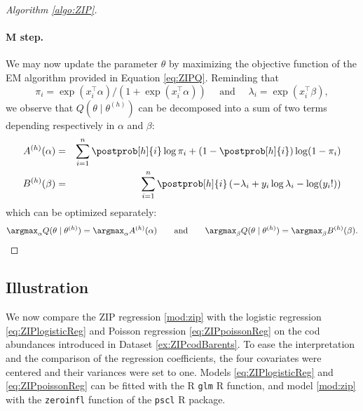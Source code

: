 \begin{proof}[Algorithm \ref{algo:ZIP}]
\paragraph{M step.}
We may now update the parameter $\theta$ by maximizing the objective function of the EM algorithm provided in Equation \eqref{eq:ZIPQ}. %
Reminding that $$\pi_i = \exp(x_i^\top \alpha) /(1 + \exp(x_i^\top \alpha)) \quad \mbox{ and } \quad  \lambda_i = \exp(x_i^\top \beta),$$ we observe that $Q(\theta \mid \theta^{(h)})$ can be decomposed into a sum of two terms depending respectively in $\alpha$ and $\beta$: 
\begin{eqnarray*}	
A^{(h)}(\alpha) &=& \sum_{i=1}^n \postprob[h]{i} \log \pi_i + (1 - \postprob[h]{i}) \log(1- \pi_i) \\
B^{(h)}(\beta)&=& \sum_{i=1}^n \postprob[h]{i} \left(-\lambda_i + y_i \log \lambda_i - \log(y_i!)\right) 
\end{eqnarray*}
which can be optimized separately: 
$$
\argmax_\alpha Q(\theta \mid \theta^{(h)}) = \argmax_\alpha A^{(h)}(\alpha)
\qquad \text{and} \qquad 
\argmax_\beta Q(\theta \mid \theta^{(h)}) = \argmax_\beta B^{(h)}(\beta).
$$

\end{proof}
\subsection{Illustration}
We now compare the ZIP regression \eqref{mod:zip} with the logistic regression \eqref{eq:ZIPlogisticReg} and Poisson regression \eqref{eq:ZIPpoissonReg} on the cod abundances introduced in Dataset \ref{ex:ZIPcodBarents}. To ease the interpretation and the comparison of the regression coefficients, the four covariates were centered and their variances were set to one. Models \eqref{eq:ZIPlogisticReg} and \eqref{eq:ZIPpoissonReg} can be fitted with the R {\tt glm} R function, and model \eqref{mod:zip} with the {\tt zeroinfl} function of the {\tt pscl} R package.

